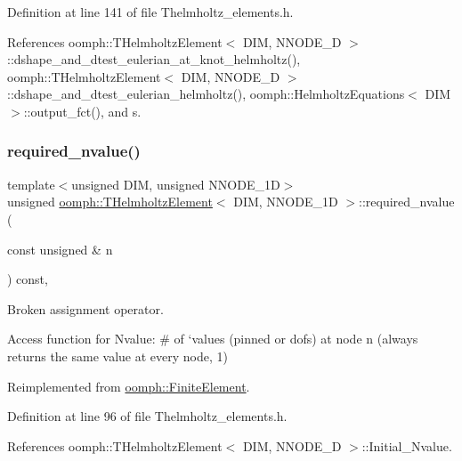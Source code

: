 Definition at line 141 of file Thelmholtz\+\_\+elements.\+h.



References oomph\+::\+T\+Helmholtz\+Element$<$ D\+I\+M, N\+N\+O\+D\+E\+\_\+D $>$\+::dshape\+\_\+and\+\_\+dtest\+\_\+eulerian\+\_\+at\+\_\+knot\+\_\+helmholtz(), oomph\+::\+T\+Helmholtz\+Element$<$ D\+I\+M, N\+N\+O\+D\+E\+\_\+D $>$\+::dshape\+\_\+and\+\_\+dtest\+\_\+eulerian\+\_\+helmholtz(), oomph\+::\+Helmholtz\+Equations$<$ D\+I\+M $>$\+::output\+\_\+fct(), and s.

\mbox{\label{classoomph_1_1THelmholtzElement_abec5553a409b17c2ca94b63848de6902}} 
\subsubsection{\texorpdfstring{required\+\_\+nvalue()}{required\_nvalue()}}
{\footnotesize\ttfamily template$<$unsigned D\+IM, unsigned N\+N\+O\+D\+E\+\_\+1D$>$ \\
unsigned \hyperlink{classoomph_1_1THelmholtzElement}{oomph\+::\+T\+Helmholtz\+Element}$<$ D\+IM, N\+N\+O\+D\+E\+\_\+1D $>$\+::required\+\_\+nvalue (\begin{DoxyParamCaption}\item[{const unsigned \&}]{n }\end{DoxyParamCaption}) const\hspace{0.3cm}{\ttfamily [inline]}, {\ttfamily [virtual]}}



Broken assignment operator. 

Access function for Nvalue\+: \# of `values\textquotesingle{} (pinned or dofs) at node n (always returns the same value at every node, 1) 

Reimplemented from \hyperlink{classoomph_1_1FiniteElement_a56610c60d5bc2d7c27407a1455471b1a}{oomph\+::\+Finite\+Element}.



Definition at line 96 of file Thelmholtz\+\_\+elements.\+h.



References oomph\+::\+T\+Helmholtz\+Element$<$ D\+I\+M, N\+N\+O\+D\+E\+\_\+D $>$\+::\+Initial\+\_\+\+Nvalue.

